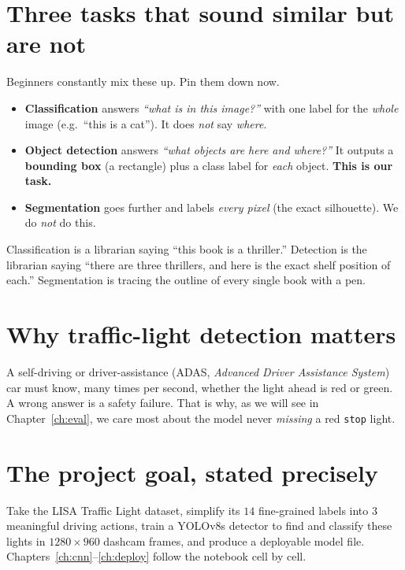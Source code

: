 \section{Three tasks that sound similar but are not}
Beginners constantly mix these up. Pin them down now.

\begin{keyconcept}
\begin{itemize}
  \item \textbf{Classification} answers \emph{``what is in this image?''}
        with one label for the \emph{whole} image (e.g.\ ``this is a cat'').
        It does \emph{not} say \emph{where}.
  \item \textbf{Object detection} answers \emph{``what objects are here
        and where?''} It outputs a \textbf{bounding box} (a rectangle)
        plus a class label for \emph{each} object. \textbf{This is our task.}
  \item \textbf{Segmentation} goes further and labels \emph{every pixel}
        (the exact silhouette). We do \emph{not} do this.
\end{itemize}
\end{keyconcept}

\begin{analogy}
Classification is a librarian saying ``this book is a thriller.''
Detection is the librarian saying ``there are three thrillers, and here
is the exact shelf position of each.'' Segmentation is tracing the
outline of every single book with a pen.
\end{analogy}

\section{Why traffic-light detection matters}
A self-driving or driver-assistance (ADAS, \emph{Advanced Driver
Assistance System}) car must know, many times per second, whether the
light ahead is red or green. A wrong answer is a safety failure. That is
why, as we will see in Chapter~\ref{ch:eval}, we care most about the
model never \emph{missing} a red \texttt{stop} light.

\section{The project goal, stated precisely}
Take the LISA Traffic Light dataset, simplify its $14$ fine-grained
labels into $3$ meaningful driving actions, train a YOLOv8s detector to
find and classify these lights in $1280\times960$ dashcam frames, and
produce a deployable model file. Chapters~\ref{ch:cnn}--\ref{ch:deploy}
follow the notebook cell by cell.

